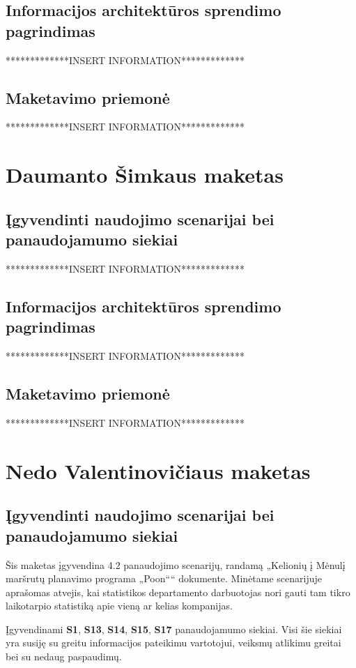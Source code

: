 \documentclass{VUMIFPSkursinis}
\begin{document}
\subsection{Informacijos architektūros sprendimo pagrindimas}
*************INSERT INFORMATION*************

\subsection{Maketavimo priemonė}
*************INSERT INFORMATION*************

\section{Daumanto Šimkaus maketas}
\subsection{Įgyvendinti naudojimo scenarijai bei panaudojamumo siekiai}
*************INSERT INFORMATION*************

\subsection{Informacijos architektūros sprendimo pagrindimas}
*************INSERT INFORMATION*************

\subsection{Maketavimo priemonė}
*************INSERT INFORMATION*************

\section{Nedo Valentinovičiaus maketas}
\subsection{Įgyvendinti naudojimo scenarijai bei panaudojamumo siekiai}
Šis maketas įgyvendina 4.2 panaudojimo scenarijų, randamą „Kelionių į Mėnulį maršrutų planavimo programa „Poon““ dokumente. Minėtame scenarijuje aprašomas atvejis, kai statistikos departamento darbuotojas nori gauti tam tikro laikotarpio statistiką apie vieną ar kelias kompanijas. 

Įgyvendinami \textbf{S1}, \textbf{S13}, \textbf{S14}, \textbf{S15}, \textbf{S17} panaudojamumo siekiai. Visi šie siekiai yra susiję su greitu informacijos pateikimu vartotojui, veiksmų atlikimu greitai bei su nedaug paspaudimų.
\end{document}
